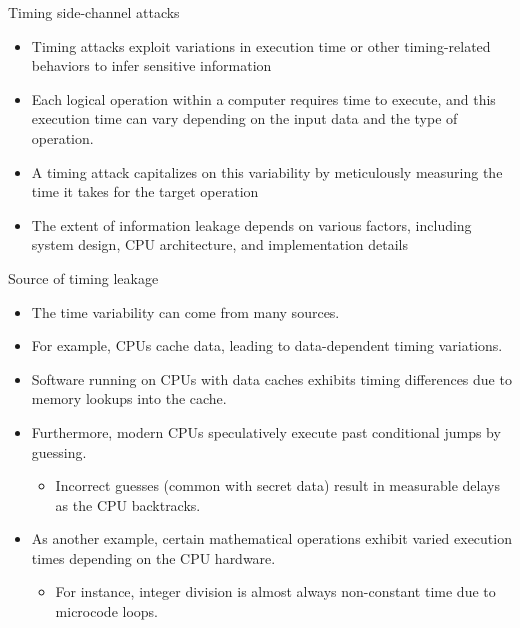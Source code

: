\begin{frame}{Timing side-channel attacks}
    \begin{itemize}
        \item Timing attacks exploit variations in execution time or other timing-related behaviors to infer sensitive information
        \item Each logical operation within a computer requires time to execute, and this execution time can vary depending on the input data and the type of operation.
        \item A timing attack capitalizes on this variability by meticulously measuring the time it takes for the target operation
        \item The extent of information leakage depends on various factors, including system design, CPU architecture, and implementation details
    \end{itemize}
\end{frame}

\begin{frame}{Source of timing leakage}
    \begin{itemize}
        \item The time variability can come from many sources.
        \item For example, CPUs cache data, leading to data-dependent timing variations.
        \item Software running on CPUs with data caches exhibits timing differences due to memory lookups into the cache.
        \item Furthermore, modern CPUs speculatively execute past conditional jumps by guessing.
        \begin{itemize}
            \item Incorrect guesses (common with secret data) result in measurable delays as the CPU backtracks.
        \end{itemize}
        \item As another example, certain mathematical operations exhibit varied execution times depending on the CPU hardware.
        \begin{itemize}
            \item For instance, integer division is almost always non-constant time due to microcode loops.
        \end{itemize}
    \end{itemize}
\end{frame}

